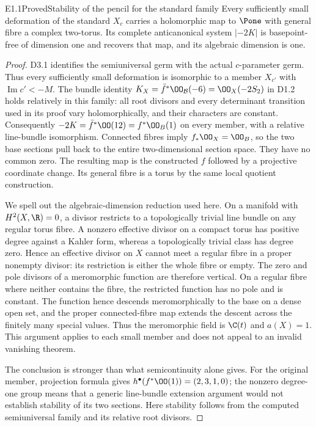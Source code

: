 \begin{claim}{E1.1}{Proved}{Stability of the pencil for the standard family}
Every sufficiently small deformation of the standard $X_c$ carries a
holomorphic map to $\Pone$ with general fibre a complex two-torus. Its
complete anticanonical system $|-2K|$ is basepoint-free of dimension one
and recovers that map, and its algebraic dimension is one.
\end{claim}
\begin{proof}
D3.1 identifies the semiuniversal germ with the actual $c$-parameter
germ. Thus every sufficiently small deformation is isomorphic to a
member $X_{c'}$ with $\operatorname{Im}c'<-M$. The bundle identity
$K_X=\bar f^*\OO_{\mathcal B}(-6)=\OO_X(-2S_2)$ in D1.2 holds
relatively in this family: all root divisors and every determinant
transition used in its proof vary holomorphically, and their characters
are constant. Consequently $-2K=\bar f^*\OO(12)=f^*\OO_B(1)$
on every member, with a relative line-bundle isomorphism. Connected
fibres imply $f_*\OO_X=\OO_B$, so the two base sections pull back to
the entire two-dimensional section space. They have no common zero.
The resulting map is the constructed $f$ followed by a projective
coordinate change. Its general fibre is a torus by the same local
quotient construction.

We spell out the algebraic-dimension reduction used here. On a
manifold with $H^2(X,\R)=0$, a divisor restricts to a topologically
trivial line bundle on any regular torus fibre. A nonzero effective
divisor on a compact torus has positive degree against a Kahler form,
whereas a topologically trivial class has degree zero. Hence an
effective divisor on $X$ cannot meet a regular fibre in a proper
nonempty divisor: its restriction is either the whole fibre or empty.
The zero and pole divisors of a meromorphic function are therefore
vertical. On a regular fibre where neither contains the fibre, the
restricted function has no pole and is constant. The function hence
descends meromorphically to the base on a dense open set, and the
proper connected-fibre map extends the descent across the finitely
many special values. Thus the meromorphic field is $\C(t)$ and
$a(X)=1$. This argument applies to each small member and does not
appeal to an invalid vanishing theorem.

The conclusion is stronger than what semicontinuity alone gives.
For the original member, projection formula gives
$h^\bullet(f^*\OO(1))=(2,3,1,0)$; the nonzero degree-one group means
that a generic line-bundle extension argument would not establish
stability of its two sections. Here stability follows from the
computed semiuniversal family and its relative root divisors.
\end{proof}

